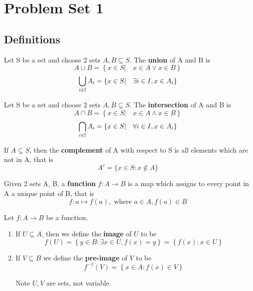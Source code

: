 \documentclass[11pt]{article}
\begin{document}
\section*{Problem Set 1}


\subsection*{Definitions}

\begin{defn}
  \label{union}
  Let S be a set and choose 2 sets $A, B \subseteq S$. The \textbf{union} of A and B is
  \[
    A\cup B = \left\{ x\in S | \quad x\in A \lor x\in B \right\}
  \]
  \[
    \bigcup_{i\in \mathbb{I}} A_i = \left\{ x\in S | \quad \exists i\in I, x\in A_i\right\}
  \]
\end{defn}

\begin{defn}
  \label{intersection}
  Let S be a set and choose 2 sets $A, B \subseteq S$. The \textbf{intersection} of A and B is
  \[
    A\cap B = \left\{ x\in S| \quad x\in A \land x\in B \right\}
  \]
  \[
    \bigcap_{i\in\mathbb{I}} A_i = \left\{ x\in S | \quad \forall i \in I, x\in A_i \right\}
  \]
\end{defn}

\begin{defn}
  \label{setcomplement}
  If $A\subseteq S$, then the \textbf{complement} of A with respect to S is all elements which are not in A, that is
  \[
    A^c = \{ x\in S: x\not\in A \}
  \]
\end{defn}

\begin{defn}
  \label{function}
  Given 2 sets A, B, a \textbf{function} $f: A\to B$ is a map which assigns to every point in A a unique point of B, that is
  \[
    f: a \mapsto f(a), \text{ where } a\in A, f(a)\in B
  \]
\end{defn}

\begin{defn}
  \label{image and preimage}
  Let $f: A\to B$ be a function.
  \begin{enumerate}
    \item If $U \subseteq A$, then we define the \textbf{image} of $U$ to be
    \[
      f(U) = \left\{ y\in B: \exists x\in U, f(x) = y\right\} = \left\{ f(x): x\in U\right\}
    \]

    \item If $V\subseteq B$ we define the \textbf{pre-image} of $V$ to be
    \[
      f^{-1}(V) = \left\{ x\in A: f(x) \in V\right\}
    \]
    \begin{rem}
      Note $U,V$ are sets, not variable.
    \end{rem}
  \end{enumerate}
\end{defn}
\end{document}
